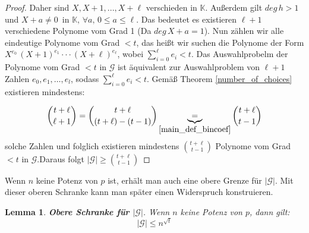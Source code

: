 \documentclass[12pt,oneside]{article}
\newtheorem{lemma}[theorem]{Lemma}
\theoremstyle{remark}
\theoremstyle{definition}
\begin{document}
\begin{proof}
Daher sind $X, X + 1, ..., X + \ell$ verschieden in $\mathbb{K}$. Außerdem gilt $deg \, h > 1$ und $X + a \neq 0 \,$ in $\mathbb{K}, \, \forall a, \, 0 \leq a \leq \ell $. Das bedeutet es existieren $\ell + 1$ verschiedene Polynome vom Grad 1 (Da $deg \, X + a = 1$). Nun zählen wir alle eindeutige Polynome vom Grad $ < t$, das heißt wir suchen die Polynome der Form $X^{e_0} \, (X + 1)^{e_1} \cdot \cdot \cdot (X + \ell)^{e_\ell}$, wobei $\sum_{i = 0}^{\ell} e_i < t$. Das Auswahlprobelm der Polynome vom Grad $ < t$ in $\mathcal{G}$ ist äquivalent zur Auswahlproblem von $\ell + 1$ Zahlen $e_0, e_1, \dots , e_l$, sodass $\sum_{i = 0}^{\ell} e_i < t$. Gemäß Theorem \ref{number_of_choices} existieren mindestens:

\begin{align*}
    {t + \ell \choose \ell + 1} = {t + \ell \choose (t + \ell) - (t - 1)} \underbrace{=}_{\ref{main_def_bincoef}} {t + \ell \choose t - 1} 
\end{align*}
solche Zahlen und folglich existieren mindestens ${t + \ell \choose t - 1}$ Polynome vom Grad $ < t $ in $\mathcal{G}$.\newline Daraus folgt $| \mathcal{G}| \geq {t + \ell \choose t - 1} $ 
\end{proof}

Wenn $n$ keine Potenz von $p$ ist, erhält man auch eine obere Grenze für $|\mathcal{G}|$. Mit dieser oberen Schranke kann man später einen Widerspruch konstruieren. 

\begin{lemma}\label{closing_lemma}
\textbf{Obere Schranke für $|\mathcal{G}|$}.\newline
Wenn $n$ keine Potenz von $p$, dann gilt:
\begin{equation}
    |\mathcal{G}| \leq  n^{\sqrt{t}}
\end{equation}
\end{lemma}
\end{document}
